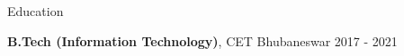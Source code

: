 \documentclass{resume} %
\begin{document}


\begin{rSection}{Education}

{\bf B.Tech (Information Technology)}, CET Bhubaneswar \hfill {2017 - 2021}\\

\end{rSection}
\end{document}
